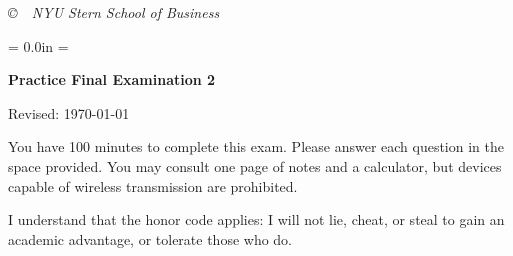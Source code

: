 \documentclass[letterpaper,12pt]{article}
\def\HeadName{Practice Final Examination 1}
\begin{document}
\begin{enumerate}
\begin{comment}
\item 
Under the quantity theory, inflation equals money growth
minus real GDP growth. Unless real GDP growth is 9\%, something's
wrong. What's wrong is that this relation is well-known not to work
in the short run.  Over periods of several years, however, it
typically works pretty well.

\item 
A leading indicator (of the economy)
is an observable economic variable whose ups and
downs precede those in (say) real GDP.
You can see this in the cross-correlation function, for example.
Common examples:  housing starts, stock market indexes,
interest rate spread (long minus short).

\item 
Central banks manage short-term interest rates through
``open market operations'': buying and selling government
securities. Selling securities, for example, reduces the amount of
currency in private circulation, which generally increases
short-term interest rates.  [Insert T-accounts here.] The story we
tell is that this reduces the liquidity of capital markets by
reducing the quantity of currency in circulation.

\end{enumerate}
\end{comment}

\end{enumerate}




\vfill \centerline{\it \copyright \ \number\year \
NYU Stern School of Business}



\newpage
\def\HeadName{Practice Final Examination 2}
\parindent = 0.0in
\parskip = \bigskipamount
\setcounter{page}{1} \thispagestyle{empty}
\Head

\centerline{\large \bf \HeadName}%
\centerline{Revised:  \today}

\bigskip
You have 100 minutes to complete this exam.  Please answer each
question in the space provided. You may consult one page of notes
and a calculator, but devices capable of wireless transmission are
prohibited.

I understand that the honor code applies: I will not lie, cheat, 
or steal to gain an academic advantage, or tolerate those who do.
\end{document}
